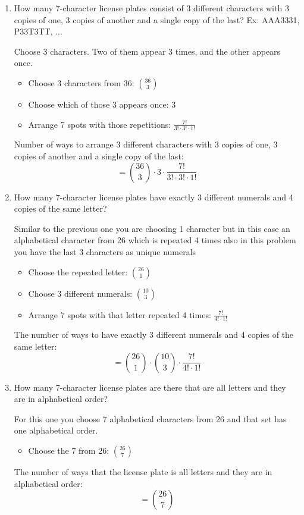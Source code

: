 \documentclass{article}
\begin{document}
\begin{enumerate}
\begin{enumerate}
      \item How many 7-character license plates consist of 3 different characters with 3 copies of
      one, 3 copies of another and a single copy of the last?
      Ex: AAA3331, P33T3TT, ...

      Choose 3 characters. Two of them appear 3 times, and the other appears once.
      \begin{itemize}
        \item Choose 3 characters from 36: $\binom{36}{3}$
        \item Choose which of those 3 appears once: $3$
        \item Arrange 7 spots with those repetitions: $\frac{7!}{3! \cdot 3! \cdot 1!}$
      \end{itemize}
      Number of ways to arrange 3 different characters with 3 copies of
      one, 3 copies of another and a single copy of the last:
      \[
        = \binom{36}{3} \cdot 3 \cdot \frac{7!}{3! \cdot 3! \cdot 1!}
      \]

      \item How many 7-character license plates have exactly 3 different numerals and 4 copies of
      the same letter?

      Similar to the previous one you are choosing 1 character but in this case an alphabetical character from 26 which is repeated 4 times also in this problem you have the last 3 characters as unique numerals
      \begin{itemize}
        \item Choose the repeated letter: $\binom{26}{1}$
        \item Choose 3 different numerals: $\binom{10}{3}$
        \item Arrange 7 spots with that letter repeated 4 times: $\frac{7!}{4! \cdot 1!}$
      \end{itemize}
      The number of ways to have exactly 3 different numerals and 4 copies of
      the same letter:
      \[
         = \binom{26}{1} \cdot \binom{10}{3} \cdot \frac{7!}{4! \cdot 1!}
      \]

      \item How many 7-character license plates are there that are all letters and they are in
      alphabetical order?

      For this one you choose 7 alphabetical characters from 26 and that set has one alphabetical order.      
      \begin{itemize}
        \item Choose the 7 from 26: $\binom{26}{7}$
      \end{itemize}
      The number of ways that the license plate is all letters and they are in
      alphabetical order:
      \[
         = \binom{26}{7}
      \]
    \end{enumerate}


\end{enumerate}
\end{document}
